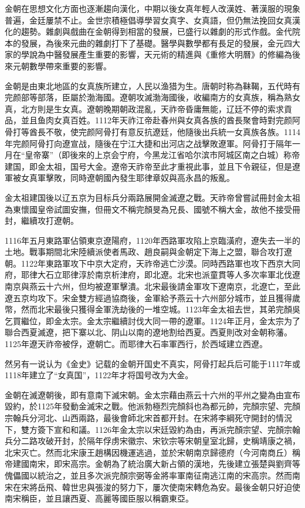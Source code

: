 金朝在思想文化方面也逐漸趨向漢化，中期以後女真年輕人改漢姓、著漢服的現象普遍，金廷屢禁不止。金世宗積極倡導學習女真字、女真語，但仍無法挽回女真漢化的趨勢。雜劇與戲曲在金朝得到相當的發展，已盛行以雜劇的形式作戲。金代院本的發展，為後來元曲的雜劇打下了基礎。醫學與數學都有長足的發展，金元四大家的學說為中醫發展產生重要的影響，天元術的精進與《重修大明曆》的修編為後來元朝數學帶來重要的影響。

金朝是由東北地區的女真族所建立，人民以渔猎为生。唐朝时称為靺鞨，五代時有完颜部等部落，臣屬於渤海國。遼朝攻滅渤海國後，收編南方的女真族，稱為熟女真，北方則是生女真。遼朝晚期朝政混亂，天祚帝昏庸無能，辽廷不停的索求貢品，並且鱼肉女真百姓。1112年天祚江帝赴春州與女真各族的酋長聚會時對完颜阿骨打等酋長不敬，使完颜阿骨打有意反抗遼廷，他隨後出兵統一女真族各族。1114年完颜阿骨打向遼宣战，隨後在宁江大捷和出河店之战擊敗遼軍。阿骨打于隔年一月在“皇帝寨”（即後來的上京会宁府，今黑龙江省哈尔滨市阿城区南之白城）称帝建国，即金太祖，国号大金。遼帝天祚帝至此才重視此事，並且下令親征，但是遼軍被女真軍擊敗，同時遼朝國內發生耶律章奴與高永昌的叛亂。

金太祖建国後以辽五京为目标兵分兩路展開金滅遼之戰。天祚帝曾嘗試冊封金太祖為東懷國皇帝試圖安撫，但冊文不稱完顏旻為兄長、國號不稱大金，故他不接受冊封，繼續攻打遼朝。

1116年五月東路軍佔領東京遼陽府，1120年西路軍攻陷上京臨潢府，遼失去一半的土地。戰事期間北宋陸續派使者馬政、趙良嗣與金朝定下海上之盟，聯合攻打遼朝。1122年東路軍攻下中京大定府，天祚帝逃亡沙漠。同時西路軍也攻下西京大同府，耶律大石立耶律淳於南京析津府，即北遼。北宋也派童貫等人多次率軍北伐遼南京與燕云十六州，但均被遼軍擊潰。北宋最後請金軍攻下遼南京，北遼亡，至此遼五京均攻下。宋金雙方經過協商後，金軍給予燕云十六州部分城市，並且獲得歲幣，然而北宋最後只獲得金軍洗劫後的一堆空城。1123年金太祖去世，其弟完顏吳乞買繼位，即金太宗。金太宗繼續討伐大同一帶的遼軍。1124年正月，金太宗为了聯合西夏滅遼，把下寨以北、阴山以南的遼地割给西夏。西夏則改对金朝称藩。1125年遼天祚帝被俘，遼朝亡。而耶律大石率軍西行，於西域建立西遼。

然另有一说认为《金史》记载的金朝开国史不真实，阿骨打起兵后可能于1117年或1118年建立了“女真国”，1122年才将国号改为大金。

金朝在滅遼朝後，即有意南下滅宋朝。金太宗藉由燕云十六州的平州之變為由宣布毀約，於1125年發動金滅宋之戰。他派勃極烈完顏斜也為都元帥，完顏宗望、完顏宗翰兵分河北、山西兩路，最後會師北宋首都开封。在宋將李綱死守開封的情況下，雙方簽下宣和和議。1126年金太宗以宋廷毀約為由，再派完顏宗望、完顏宗翰兵分二路攻破开封，於隔年俘虏宋徽宗、宋钦宗等宋朝皇室北歸，史稱靖康之禍，北宋灭亡。然而北宋康王趙構因機運逃過，並於宋朝南京歸德府（今河南商丘）稱帝建國南宋，即宋高宗。金朝為了統治廣大新占領的漢地，先後建立張楚與劉齊等傀儡國以統治之，並且多次派完顏宗弼等金將率軍南征南逃江南的宋高宗。然而南宋在宋將岳飛、韓世忠與張浚的努力下，屢次使南宋轉危為安。最後金朝只好迫使南宋稱臣，並且讓西夏、高麗等國臣服以稱霸東亞。

